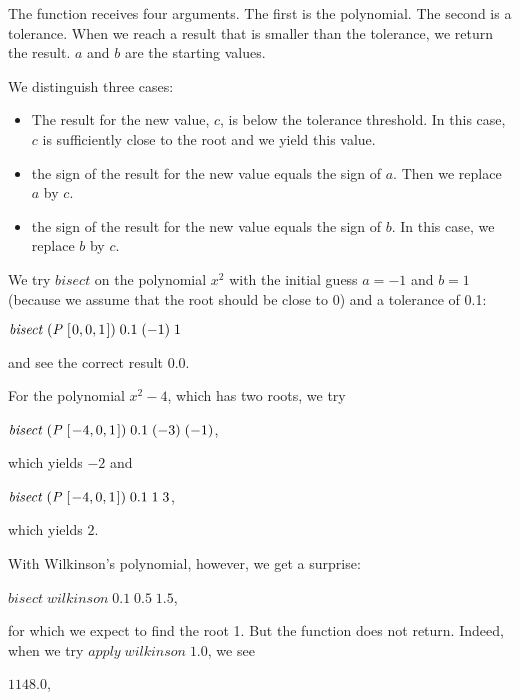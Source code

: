 \documentclass[tikz]{scrreprt}
\newcommand{\Conid}[1]{\mathit{#1}}
\newcommand{\Varid}[1]{\mathit{#1}}
\begin{document}
The function receives four arguments.
The first is the polynomial.
The second is a tolerance.
When we reach a result that is smaller
than the tolerance, we return the result.
$a$ and $b$ are the starting values.

We distinguish three cases:
\begin{itemize}
\item The result for the new value, $c$, 
      is below the tolerance threshold.
      In this case, $c$ is sufficiently close
      to the root and we yield this value.
\item the sign of the result for the new value
      equals the sign of $a$. Then we replace
      $a$ by $c$.
\item the sign of the result for the new value
      equals the sign of $b$. In this case,
      we replace $b$ by $c$.
\end{itemize}

We try \ensuremath{\Varid{bisect}} on the polynomial $x^2$ with
the initial guess $a=-1$ and $b=1$ (because we
assume that the root should be close to 0) and
a tolerance of 0.1:

\ensuremath{\Varid{bisect}\;(\Conid{P}\;[\mskip1.5mu \mathrm{0},\mathrm{0},\mathrm{1}\mskip1.5mu])\;\mathrm{0.1}\;(\mathbin{-}\mathrm{1})\;\mathrm{1}}

and see the correct result \ensuremath{\mathrm{0.0}}.

For the polynomial $x^2 - 4$, which has two roots,
we try 

\ensuremath{\Varid{bisect}\;(\Conid{P}\;[\mskip1.5mu \mathbin{-}\mathrm{4},\mathrm{0},\mathrm{1}\mskip1.5mu])\;\mathrm{0.1}\;(\mathbin{-}\mathrm{3})\;(\mathbin{-}\mathrm{1})},

which yields \ensuremath{\mathbin{-}\mathrm{2}} and 

\ensuremath{\Varid{bisect}\;(\Conid{P}\;[\mskip1.5mu \mathbin{-}\mathrm{4},\mathrm{0},\mathrm{1}\mskip1.5mu])\;\mathrm{0.1}\;\mathrm{1}\;\mathrm{3}},

which yields \ensuremath{\mathrm{2}}.

With Wilkinson's polynomial, however,
we get a surprise:

\ensuremath{\Varid{bisect}\;\Varid{wilkinson}\;\mathrm{0.1}\;\mathrm{0.5}\;\mathrm{1.5}},

for which we expect to find the root 1.
But the function does not return.
Indeed, when we try \ensuremath{\Varid{apply}\;\Varid{wilkinson}\;\mathrm{1.0}}, we see

\ensuremath{\mathrm{1148.0}},
\end{document}
